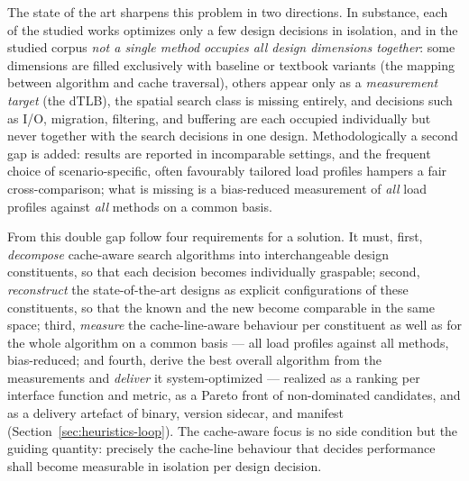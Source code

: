 \begin{nurlang}
The state of the art sharpens this problem in two directions. In substance, each of the studied works
optimizes only a few design decisions in isolation, and in the studied corpus \emph{not a single method
occupies all design dimensions together}: some dimensions are filled exclusively with baseline or
textbook variants (the mapping between algorithm and cache traversal), others appear only as a
\emph{measurement target} (the dTLB), the spatial search class is missing entirely, and decisions such as
I/O, migration, filtering, and buffering are each occupied individually but never together with the
search decisions in one design. Methodologically a second gap is added: results are reported in
incomparable settings, and the frequent choice of scenario-specific, often favourably tailored load
profiles hampers a fair cross-comparison; what is missing is a bias-reduced measurement of \emph{all}
load profiles against \emph{all} methods on a common basis.

From this double gap follow four requirements for a solution. It must, first, \emph{decompose}
cache-aware search algorithms into interchangeable design constituents, so that each decision becomes
individually graspable; second, \emph{reconstruct} the state-of-the-art designs as explicit
configurations of these constituents, so that the known and the new become comparable in the same space;
third, \emph{measure} the cache-line-aware behaviour per constituent as well as for the whole algorithm
on a common basis --- all load profiles against all methods, bias-reduced; and fourth, derive the best
overall algorithm from the measurements and \emph{deliver} it system-optimized --- realized as a ranking
per interface function and metric, as a Pareto front of non-dominated candidates, and as a delivery
artefact of binary, version sidecar, and manifest (Section~\ref{sec:heuristics-loop}). The cache-aware
focus is no side condition but the guiding quantity: precisely the cache-line behaviour that decides
performance shall become measurable in isolation per design decision.
\end{nurlang}
